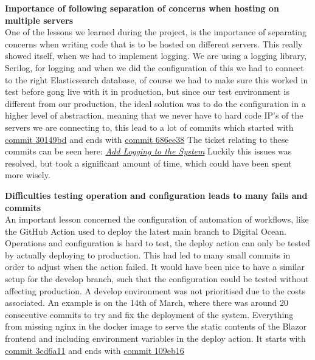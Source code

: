 \documentclass[10pt]{article}
\begin{document}
\textbf{Importance of following separation of concerns when hosting on multiple servers}\\
One of the lessons we learned during the project, is the importance of separating concerns when writing code that is to be hosted on different servers. This really showed itself, when we had to implement logging.
We are using a logging library, Serilog, for logging and when we did the configuration of this we had to connect to the right Elasticsearch database, of course we had to make sure this worked in test before gong live with it in production, but since our test environment is different from our production, the ideal solution was to do the configuration in a higher level of abstraction, meaning that we never have to hard code IP's of the servers we are connecting to, this lead to a lot of commits which started with \href{https://github.com/Arklaide/devopsITUproject/commit/30149bd9f5b1696ac1e10e3e6806d8db11e16c26}{commit 30149bd} and ends with \href{https://github.com/Arklaide/devopsITUproject/commit/686ee3893fabcce450d1844bf1743780d690413a}{commit 686ee38}
The ticket relating to these commits can be seen here: \href{https://github.com/Arklaide/devopsITUproject/issues/61}{\textit{Add Logging to the System}}
Luckily this issues was resolved, but took a significant amount of time, which could have been spent more wisely.

\textbf{Difficulties testing operation and configuration leads to many fails and commits}\\
An important lesson concerned the configuration of automation of workflows, like the GitHub Action used to deploy the latest main branch to Digital Ocean. Operations and configuration is hard to test, the deploy action can only be tested by actually deploying to production. This had led to many small commits in order to adjust when the action failed. It would have been nice to have a similar setup for the develop branch, such that the configuration could be tested without affecting production. A develop environment was not prioritised due to the costs associated. An example is on the 14th of March, where there was around 20 consecutive commits to try and fix the deployment of the system. Everything from missing nginx in the docker image to serve the static contents of the Blazor frontend and including environment variables in the deploy action. It starts with \href{https://github.com/Arklaide/devopsITUproject/commit/3cd6a117458ed81d38d57dfeb5b15afc5e4b69f5}{commit 3cd6a11} and ends with \href{https://github.com/Arklaide/devopsITUproject/commit/11e7e21605977232ae87d0dc9dddf2ac9f25cb8f}{commit 109eb16}
\end{document}
